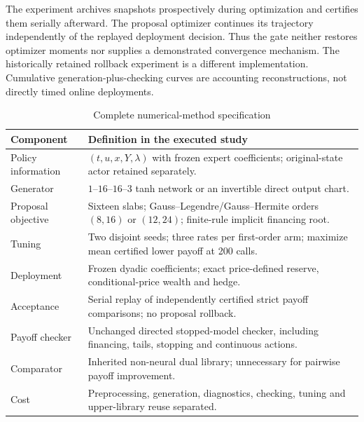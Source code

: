 The experiment archives snapshots prospectively during optimization and certifies them serially afterward. The proposal optimizer continues its trajectory independently of the replayed deployment decision. Thus the gate neither restores optimizer moments nor supplies a demonstrated convergence mechanism. The historically retained rollback experiment is a different implementation. Cumulative generation-plus-checking curves are accounting reconstructions, not directly timed online deployments.

\begin{table}[t]\centering\small
\caption{Complete numerical-method specification}\label{tab:r24algorithm}
\begin{tabularx}{\textwidth}{lX}\toprule
Component & Definition in the executed study\\\midrule
Policy information & $(t,u,x,Y,\lambda)$ with frozen expert coefficients; original-state actor retained separately.\\
Generator & $1$--$16$--$16$--$3$ tanh network or an invertible direct output chart.\\
Proposal objective & Sixteen slabs; Gauss--Legendre/Gauss--Hermite orders $(8,16)$ or $(12,24)$; finite-rule implicit financing root.\\
Tuning & Two disjoint seeds; three rates per first-order arm; maximize mean certified lower payoff at 200 calls.\\
Deployment & Frozen dyadic coefficients; exact price-defined reserve, conditional-price wealth and hedge.\\
Acceptance & Serial replay of independently certified strict payoff comparisons; no proposal rollback.\\
Payoff checker & Unchanged directed stopped-model checker, including financing, tails, stopping and continuous actions.\\
Comparator & Inherited non-neural dual library; unnecessary for pairwise payoff improvement.\\
Cost & Preprocessing, generation, diagnostics, checking, tuning and upper-library reuse separated.\\\bottomrule
\end{tabularx}\end{table}
